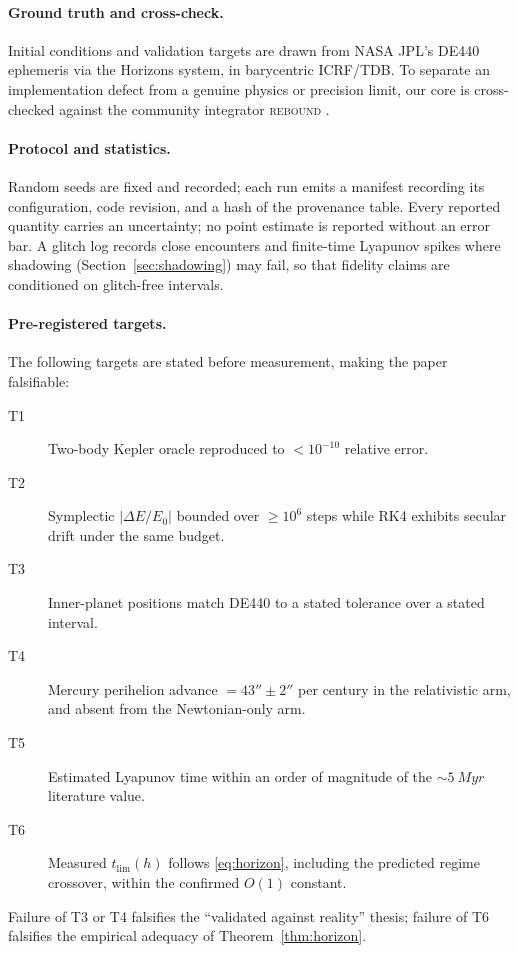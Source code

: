 \documentclass[11pt]{article}
\theoremstyle{definition}
\begin{document}
\paragraph{Ground truth and cross-check.}
Initial conditions and validation targets are drawn from NASA JPL's DE440
ephemeris via the Horizons system, in barycentric ICRF/TDB. To separate an
implementation defect from a genuine physics or precision limit, our core is
cross-checked against the community integrator \textsc{rebound} \cite{rebound}.

\paragraph{Protocol and statistics.}
Random seeds are fixed and recorded; each run emits a manifest recording its
configuration, code revision, and a hash of the provenance table. Every reported
quantity carries an uncertainty; no point estimate is reported without an error
bar. A glitch log records close encounters and finite-time Lyapunov spikes where
shadowing (Section~\ref{sec:shadowing}) may fail, so that fidelity claims are
conditioned on glitch-free intervals.

\paragraph{Pre-registered targets.}
The following targets are stated before measurement, making the paper
falsifiable:
\begin{description}
  \item[T1] Two-body Kepler oracle reproduced to $< 10^{-10}$ relative error.
  \item[T2] Symplectic $|\Delta E/E_0|$ bounded over $\ge 10^6$ steps while RK4
  exhibits secular drift under the same budget.
  \item[T3] Inner-planet positions match DE440 to a stated tolerance over a
  stated interval.
  \item[T4] Mercury perihelion advance $= 43'' \pm 2''$ per century in the
  relativistic arm, and absent from the Newtonian-only arm.
  \item[T5] Estimated Lyapunov time within an order of magnitude of the
  $\sim\!\SI{5}{Myr}$ literature value.
  \item[T6] Measured $t_{\mathrm{lim}}(h)$ follows \eqref{eq:horizon}, including
  the predicted regime crossover, within the confirmed $O(1)$ constant.
\end{description}
Failure of T3 or T4 falsifies the ``validated against reality'' thesis; failure
of T6 falsifies the empirical adequacy of Theorem~\ref{thm:horizon}.
\end{document}
